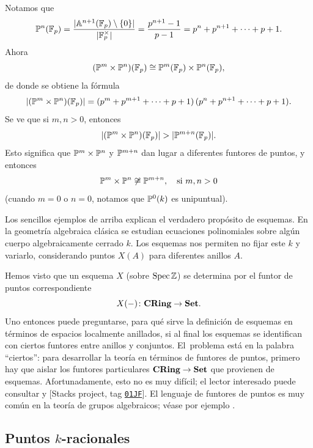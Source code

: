 \documentclass{article}
\numberwithin{equation}{section}
\theoremstyle{definition}
\begin{document}
\begin{ejemplo}
  Notamos que
  \[ \mathbb{P}^n (\mathbb{F}_p) = \frac{|\mathbb{A}^{n+1} (\mathbb{F}_p) \setminus \{ 0 \}|}{|\mathbb{F}_p^\times|}
     = \frac{p^{n+1} - 1}{p-1} = p^n + p^{n+1} + \cdots + p + 1. \]
  Ahora
  $$(\mathbb{P}^m \times \mathbb{P}^n) (\mathbb{F}_p) \cong \mathbb{P}^m (\mathbb{F}_p) \times \mathbb{P}^n (\mathbb{F}_p),$$
  de donde se obtiene la fórmula
  \[ |(\mathbb{P}^m \times \mathbb{P}^n) (\mathbb{F}_p)| =
     (p^m + p^{m+1} + \cdots + p + 1)\,(p^n + p^{n+1} + \cdots + p + 1). \]
  Se ve que si $m,n > 0$, entonces
  $$|(\mathbb{P}^m \times \mathbb{P}^n) (\mathbb{F}_p)| > |\mathbb{P}^{m+n} (\mathbb{F}_p)|.$$
  Esto significa que $\mathbb{P}^m\times \mathbb{P}^n$ y $\mathbb{P}^{m+n}$ dan lugar a diferentes
  funtores de puntos, y entonces
  $$\mathbb{P}^m \times \mathbb{P}^n \not\cong \mathbb{P}^{m+n}, \quad \text{si }m,n>0$$
  (cuando $m=0$ o $n=0$, notamos que $\mathbb{P}^0 (k)$ es unipuntual).
\end{ejemplo}

\vspace{1em}

Los sencillos ejemplos de arriba explican el verdadero propósito de esquemas.
En la geometría algebraica clásica se estudian ecuaciones polinomiales sobre
algún cuerpo algebraicamente cerrado $k$. Los esquemas nos permiten no fijar
este $k$ y variarlo, considerando puntos $X (A)$ para diferentes anillos $A$.

\vspace{1em}

Hemos visto que un esquema $X$ (sobre $\operatorname{Spec} \mathbb{Z}$) se determina por el funtor de
puntos correspondiente
$$X (-)\colon \text{\bf CRing} \to \text{\bf Set}.$$
Uno entonces puede preguntarse, para qué sirve la definición de esquemas
en términos de espacios localmente anillados, si al final los esquemas
se identifican con ciertos funtores entre anillos y conjuntos. El~problema está
en la palabra ``ciertos'': para desarrollar la teoría en términos de funtores
de puntos, primero hay que aislar los funtores particulares
$\text{\bf CRing} \to \text{\bf Set}$ que provienen de esquemas. Afortunadamente,
esto no es muy difícil; el lector interesado puede consultar \cite[Chapter
VI]{Eisenbud-Harris} y [Stacks project, tag
\texttt{\href{https://stacks.math.columbia.edu/tag/01JF}{01JF}}].
El lenguaje de funtores de puntos es muy común en la teoría de grupos
algebraicos; véase por ejemplo \cite{Demazure-Gabriel}.

\subsection{Puntos $k$-racionales}
\end{document}
